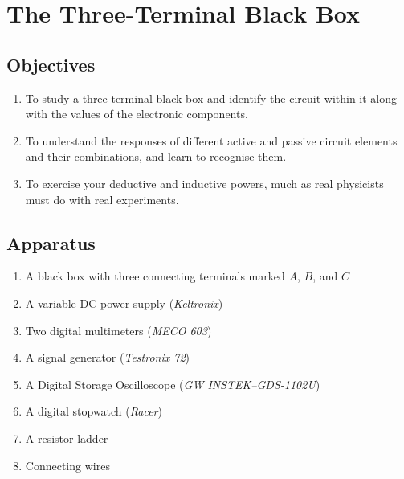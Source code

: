 
\chapter{The Three-Terminal Black Box}

\section*{Objectives}

\begin{enumerate}
\item To study a three-terminal black box and identify the circuit within it along with the values of the electronic components.

\item To understand the responses of different active and passive circuit elements and their combinations, and learn to recognise them.

\item To exercise your deductive and inductive powers, much as real physicists must do with real experiments.

\end{enumerate}




\section*{Apparatus}

\begin{enumerate}
\item A black box with three connecting terminals marked $A$, $B$, and $C$
\item A variable DC power supply (\textit{Keltronix})
\item Two digital multimeters (\textit{MECO 603})
\item A signal generator (\textit{Testronix 72})
\item A Digital Storage Oscilloscope (\textit{GW INSTEK–GDS-1102U})
\item A digital stopwatch (\textit{Racer})
\item A resistor ladder
\item Connecting wires

\end{enumerate}


